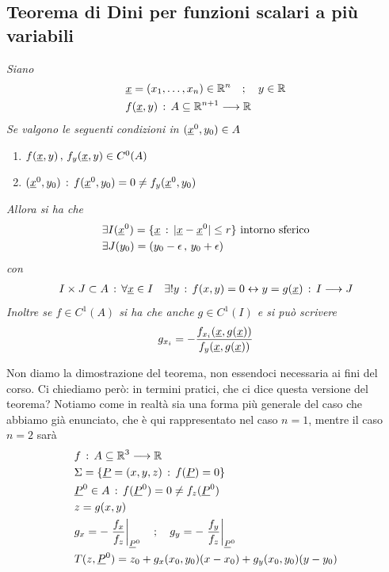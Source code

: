 \subsection{Teorema di Dini per funzioni scalari a più variabili}
\textit{Siano}
\begin{align}
	{}&\underline{x}= (x_1,\dots, x_n)\in \mathbb{R}^n\quad ; \quad y \in \mathbb{R}\\
	&f(\underline{x},y) \, : \, A \subseteq \mathbb{R}^{n+1} \longrightarrow \mathbb{R}
\end{align}
\textit{Se valgono le seguenti condizioni in $(\underline{x}^0,y_0)\in A$}
\begin{enumerate}
	\item $f(\underline{x},y)\, , \, f_y(\underline{x},y)\in C^0(A)$
	\item $(\underline{x}^0,y_0) \, : \, f(\underline{x}^0,y_0) =0 \neq f_y(\underline{x}^0,y_0)$ 
\end{enumerate}
\textit{Allora si ha che}
\begin{align}
	{}&\exists I(\underline{x}^0) = \{\underline{x} \, : \, |\underline{x} - \underline{x}^0|\leq r \} \text{ intorno sferico}\\
	&\exists J(y_0)=(y_0-\epsilon \, , \, y_0+\epsilon)
\end{align}
\textit{con}
\begin{align}
	I \times J \subset A \, : \, \forall \underline{x} \in I \quad \exists ! y \, : \, f(x,y)=0 \leftrightarrow y= g(\underline{x}) \, : \, I\longrightarrow J
\end{align}
\textit{Inoltre se $f\in C^1(A)$ si ha che anche $g\in C^1(I)$ e si può scrivere}
\begin{align}
	g_{x_i}= - \frac{f_{x_i} (\underline{x},g(\underline{x}))}{f_y(\underline{x},g(\underline{x}))}
\end{align}

\bigskip
Non diamo la dimostrazione del teorema, non essendoci necessaria ai fini del corso. Ci chiediamo però: in termini pratici, che ci dice questa versione del teorema? Notiamo come in realtà sia una forma più generale del caso che abbiamo già enunciato, che è qui rappresentato nel caso $n=1$, mentre il caso $n=2$ sarà
\begin{align}
	{}&f \, : \, A\subseteq \mathbb{R}^{3} \longrightarrow \mathbb{R}^{}\\
	&\Sigma = \{\underline{P} = (x,y,z) \, : \, f(\underline{P})=0 \}\\
	& \underline{P}^0\in A \, : \, f(\underline{P}^0)=0\neq f_z(\underline{P}^0)\\
	&z= g(x,y) \\
	&g_x = - \left. \frac{f_x}{f_z}\right|_{\underline{P}^0} \quad ; \quad g_y = - \left. \frac{f_y}{f_z}\right|_{\underline{P}^0}\\
	&T(z,\underline{P}^0)= z_0 + g_x(x_0,y_0) (x-x_0) + g_y(x_0,y_0)(y-y_0)
\end{align}

